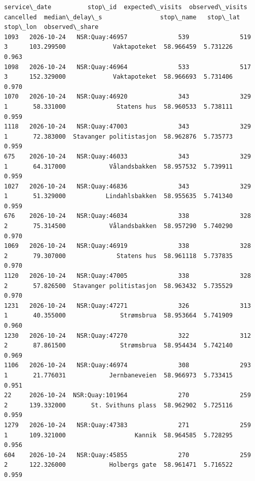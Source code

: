 \documentclass[11pt]{article}
\begin{document}
    
    \begin{Verbatim}[commandchars=\\\{\}]
     service\_date          stop\_id  expected\_visits  observed\_visits  cancelled  median\_delay\_s                stop\_name   stop\_lat  stop\_lon  observed\_share
1093   2026-10-24   NSR:Quay:46957              539              519          3      103.299500             Vaktapoteket  58.966459  5.731226           0.963
1098   2026-10-24   NSR:Quay:46964              533              517          3      152.329000             Vaktapoteket  58.966693  5.731406           0.970
1070   2026-10-24   NSR:Quay:46920              343              329          1       58.331000              Statens hus  58.960533  5.738111           0.959
1118   2026-10-24   NSR:Quay:47003              343              329          1       72.383000  Stavanger politistasjon  58.962876  5.735773           0.959
675    2026-10-24   NSR:Quay:46033              343              329          1       64.317000            Vålandsbakken  58.957532  5.739911           0.959
1027   2026-10-24   NSR:Quay:46836              343              329          1       51.329000           Lindahlsbakken  58.955635  5.741340           0.959
676    2026-10-24   NSR:Quay:46034              338              328          2       75.314500            Vålandsbakken  58.957290  5.740290           0.970
1069   2026-10-24   NSR:Quay:46919              338              328          2       79.307000              Statens hus  58.961118  5.737835           0.970
1120   2026-10-24   NSR:Quay:47005              338              328          2       57.826500  Stavanger politistasjon  58.963432  5.735529           0.970
1231   2026-10-24   NSR:Quay:47271              326              313          1       40.355000               Strømsbrua  58.953664  5.741909           0.960
1230   2026-10-24   NSR:Quay:47270              322              312          2       87.861500               Strømsbrua  58.954434  5.742140           0.969
1106   2026-10-24   NSR:Quay:46974              308              293          1       21.776031            Jernbaneveien  58.966973  5.733415           0.951
22     2026-10-24  NSR:Quay:101964              270              259          2      139.332000       St. Svithuns plass  58.962902  5.725116           0.959
1279   2026-10-24   NSR:Quay:47383              271              259          1      109.321000                   Kannik  58.964585  5.728295           0.956
604    2026-10-24   NSR:Quay:45855              270              259          2      122.326000            Holbergs gate  58.961471  5.716522           0.959
    \end{Verbatim}
\end{document}
